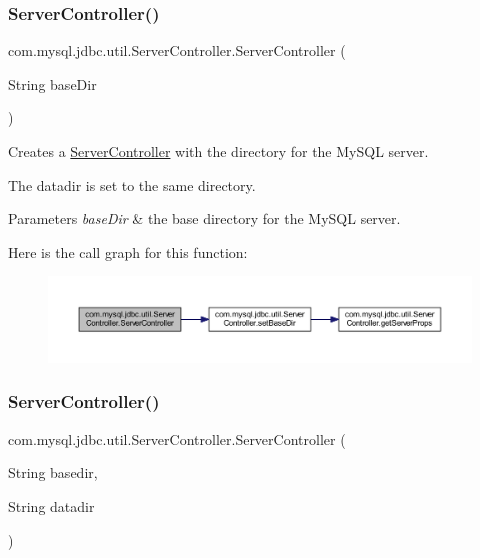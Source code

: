 \subsubsection{\texorpdfstring{Server\+Controller()}{ServerController()}\hspace{0.1cm}{\footnotesize\ttfamily [1/2]}}
{\footnotesize\ttfamily com.\+mysql.\+jdbc.\+util.\+Server\+Controller.\+Server\+Controller (\begin{DoxyParamCaption}\item[{String}]{base\+Dir }\end{DoxyParamCaption})}

Creates a \mbox{\hyperlink{classcom_1_1mysql_1_1jdbc_1_1util_1_1_server_controller}{Server\+Controller}} with the directory for the My\+S\+QL server.

The \textquotesingle{}datadir\textquotesingle{} is set to the same directory.


\begin{DoxyParams}{Parameters}
{\em base\+Dir} & the base directory for the My\+S\+QL server. \\
\hline
\end{DoxyParams}
Here is the call graph for this function\+:
\nopagebreak
\begin{figure}[H]
\begin{center}
\leavevmode
\includegraphics[width=350pt]{classcom_1_1mysql_1_1jdbc_1_1util_1_1_server_controller_aa9752aa2669c5aa953af66f978cf09a1_cgraph}
\end{center}
\end{figure}
\mbox{\label{classcom_1_1mysql_1_1jdbc_1_1util_1_1_server_controller_aedc0e2a7413502f19130574fc8785b6f}} 
\subsubsection{\texorpdfstring{Server\+Controller()}{ServerController()}\hspace{0.1cm}{\footnotesize\ttfamily [2/2]}}
{\footnotesize\ttfamily com.\+mysql.\+jdbc.\+util.\+Server\+Controller.\+Server\+Controller (\begin{DoxyParamCaption}\item[{String}]{basedir,  }\item[{String}]{datadir }\end{DoxyParamCaption})}

